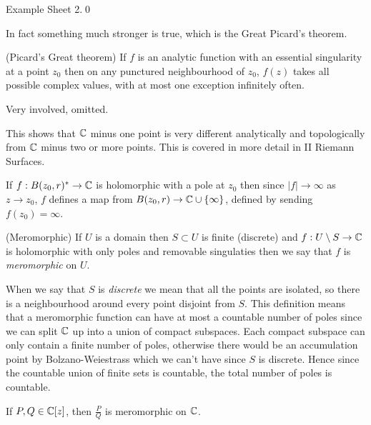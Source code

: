 \documentclass{article}
\begin{document}
\pf Example Sheet 2.\qed
\par
In fact something much stronger is true, which is the Great Picard's theorem.
\begin{theorem}
	(Picard's Great theorem) If $ f $ is an analytic function with an essential singularity at a point $ z_0 $ then on any punctured neighbourhood of $ z_0 $, $ f(z) $ takes all possible complex values, with at most one exception infinitely often.
\end{theorem}
\pf Very involved, omitted.
\begin{remark}
  This shows that $ \mathbb{C} $ minus one point is very different analytically and topologically from $ \mathbb{C} $ minus two or more points. This is covered in more detail in II Riemann Surfaces.
\end{remark}
\begin{remark}
	If $ f:B(z_0,r)^* \to \mathbb{C} $ is holomorphic with a pole at $ z_0 $ then since $ |f| \to \infty $ as $ z\to z_0 $, $ f $ defines a map from $ B(z_0,r) \to \mathbb{C} \cup \{\infty\} $, defined by sending $ f(z_0)=\infty $.
\end{remark} 
\begin{definition}
	(Meromorphic) If $ U $ is a domain then $ S \subset U $ is finite (discrete) and $ f:U\setminus S \to \mathbb{C} $ is holomorphic with only poles and removable singulaties then we say that $ f $ is \textit{meromorphic} on $ U $.
\end{definition}
\begin{remark}
	When we say that $ S $ is \textit{discrete} we mean that all the points are isolated, so there is a neighbourhood around every point disjoint from $ S $. This definition means that a meromorphic function can have at most a countable number of poles since we can split $ \mathbb{C} $ up into a union of compact subspaces. Each compact subspace can only contain a finite number of poles, otherwise there would be an accumulation point by Bolzano-Weiestrass which we can't have since $ S $ is discrete. Hence since the countable union of finite sets is countable, the total number of poles is countable.
\end{remark}
\begin{example}
	If $ P,Q\in \mathbb{C}[z] $, then $ \frac PQ $ is meromorphic on $ \mathbb{C} $.
\end{example}
\end{document}
